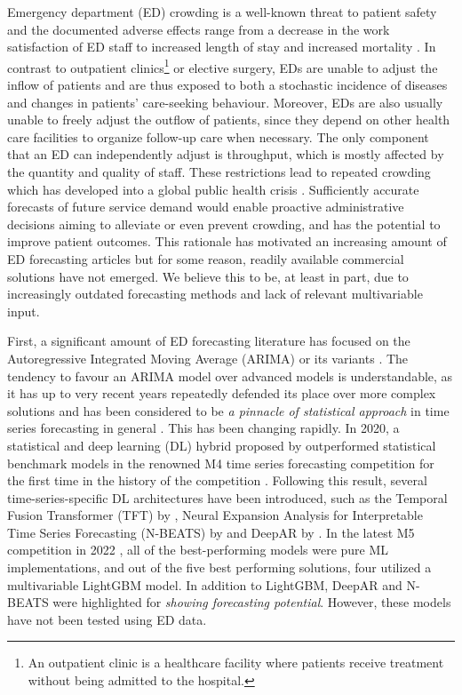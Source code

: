 Emergency department (ED) crowding is a well-known threat to patient safety \cite{Boyle2012} and the documented adverse effects range from a decrease in the work satisfaction of ED staff \cite{Eriksson2018} to increased length of stay \cite{McCarthy2009} and increased mortality \cite{Guttmann2011, Richardson2006, Berg2019, Jo2014}. In contrast to outpatient clinics\footnote{An outpatient clinic is a healthcare facility where patients receive treatment without being admitted to the hospital.} or elective surgery, EDs are unable to adjust the inflow of patients and are thus exposed to both a stochastic incidence of diseases and changes in patients’ care-seeking behaviour. Moreover, EDs are also usually unable to freely adjust the outflow of patients, since they depend on other health care facilities to organize follow-up care when necessary. The only component that an ED can independently adjust is throughput, which is mostly affected by the quantity \cite{Bucheli2004} and quality \cite{Trotzky2021} of staff. These restrictions lead to repeated crowding which has developed into a global public health crisis \cite{Pearce2023}. Sufficiently accurate forecasts of future service demand would enable proactive administrative decisions aiming to alleviate or even prevent crowding, and has the potential to improve patient outcomes. This rationale has motivated an increasing amount of ED forecasting articles \cite{Gul2018} but for some reason, readily available commercial solutions have not emerged. We believe this to be, at least in part, due to increasingly outdated forecasting methods and lack of relevant multivariable input.

First, a significant amount of ED forecasting literature has focused on the Autoregressive Integrated Moving Average (ARIMA) or its variants \cite{Gul2020}. The tendency to favour an ARIMA model over advanced models is understandable, as it has  up to very recent years repeatedly defended its place over more complex solutions \cite{Zhou2018, Whitt2019, Cheng2021} and has been considered to be \emph{a pinnacle of statistical approach} in time series forecasting in general \cite{Oreshkin2019}. This has been changing rapidly. In 2020, a statistical and deep learning (DL) hybrid proposed by \citet{Smyl2020} outperformed statistical benchmark models in the renowned M4 time series forecasting competition for the first time in the history of the competition \cite{Makridakis2020}. Following this result, several time-series-specific DL architectures have been introduced, such as the Temporal Fusion Transformer (TFT) by \citet{Lim2021}, Neural Expansion Analysis for Interpretable Time Series Forecasting (N-BEATS) by \citet{Oreshkin2019} and DeepAR by \citet{Salinas2020}. In the latest M5 competition in 2022 \cite{Makridakis2022}, all of the best-performing models were pure ML implementations, and out of the five best performing solutions, four utilized a multivariable LightGBM model\cite{Ke2017}. In addition to LightGBM, DeepAR and N-BEATS were highlighted for \emph{showing forecasting potential}. However, these models have not been tested using ED data.

